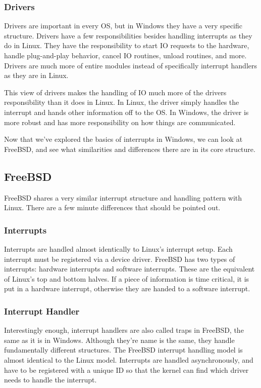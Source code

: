 \documentclass[10pt,letterpaper,onecolumn,draftclsnofoot]{IEEEtran}
\begin{document}
\subsubsection{Drivers}
Drivers are important in every OS, but in Windows they have a very specific
structure. Drivers have a few responsibilities besides handling interrupts as
they do in Linux. They have the responsibility to start IO requests to the hardware,
handle plug-and-play behavior, cancel IO routines, unload routines, and more.
Drivers are much more of entire modules instead of specifically interrupt handlers
as they are in Linux. \cite{internals2}

This view of drivers makes the handling of IO much more of the drivers responsibility
than it does in Linux. In Linux, the driver simply handles the interrupt and hands
other information off to the OS. In Windows, the driver is more robust and has
more responsibility on how things are communicated.

Now that we've explored the basics of interrupts in Windows, we can look at
FreeBSD, and see what similarities and differences there are in its core structure.

\subsection{FreeBSD}
FreeBSD shares a very similar interrupt structure and handling pattern with
Linux. There are a few minute differences that should be pointed out.
\subsubsection{Interrupts}
Interrupts are handled almost identically to Linux's interrupt setup. Each
interrupt must be registered via a device driver. FreeBSD has two types of
interrupts: hardware interrupts and software interrupts. These are the equivalent
of Linux's top and bottom halves. If a piece of information is time critical,
it is put in a hardware interrupt, otherwise they are handed to a software
interrupt. \cite{freebsd2016}
\subsubsection{Interrupt Handler}
Interestingly enough, interrupt handlers are also called traps in FreeBSD, the
same as it is in Windows. Although they're name is the same, they handle fundamentally
different structures. The FreeBSD interrupt handling model is almost identical
to the Linux model. Interrupts are handled asynchronously, and have to be registered
with a unique ID so that the kernel can find which driver needs to handle the
interrupt. \cite{freebsd2016}
\end{document}
